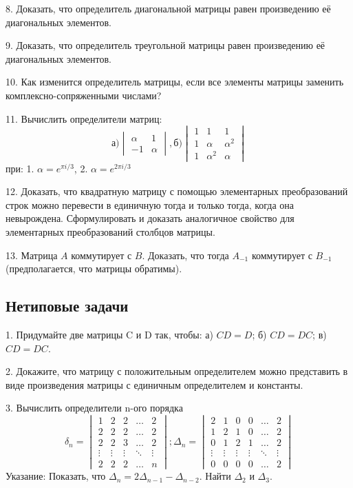 \documentclass[12pt]{article}
\begin{document}
8. Доказать, что определитель диагональной матрицы равен произведению её диагональных элементов.

9. Доказать, что определитель треугольной матрицы равен произведению её диагональных элементов.

10. Как изменится определитель матрицы, если все элементы матрицы заменить комплексно-сопряженными числами?

11. Вычислить определители матриц:
\[
\text{а)}\begin{vmatrix}
\alpha & 1\\
-1 & \alpha
\end{vmatrix},
\text{б)}\begin{vmatrix}
1 & 1 & 1\\
1 & \alpha & \alpha^2\\
1 & \alpha^2 & \alpha
\end{vmatrix}
\] при: 1. $\alpha = e^{\pi i/3}$, 2. $\alpha = e^{2\pi i/3}$


12. Доказать, что квадратную матрицу с помощью элементарных преобразований строк можно перевести в единичную тогда и только тогда, когда она невырождена. Сформулировать и доказать аналогичное свойство для элементарных преобразований столбцов матрицы.

13. Матрица $A$ коммутирует с $B$. Доказать, что тогда $A_{-1}$ коммутирует с $B_{-1}$ (предполагается, что матрицы обратимы).


\subsection*{Нетиповые задачи}	

1. Придумайте две матрицы C и D так, чтобы: а) $CD = D$; б) $CD = DC$; в) $CD = DC$.

2. Докажите, что матрицу с положительным определителем можно представить в виде произведения матрицы с единичным определителем и константы.

3. Вычислить определители n-ого порядка
\[
\delta_{n} = \begin{vmatrix}
1 & 2 & 2 & \dots & 2\\
2 & 2 & 2 & \dots & 2\\
2 & 2 & 3 & \dots & 2\\
\vdots & \vdots & \vdots & \ddots & \vdots\\ 
2 & 2 & 2 & \dots & n
\end{vmatrix}; 
\Delta_{n} = 
\begin{vmatrix}
2 & 1 & 0 & 0 & \dots & 2\\
1 & 2 & 1 & 0 & \dots & 2\\
0 & 1 & 2 & 1 & \dots & 2\\
\vdots & \vdots & \vdots & \vdots & \ddots & \vdots\\
0 & 0 & 0 & 0 & \dots & 2
\end{vmatrix}
\]
{\small Указание: Показать, что $\Delta_{n} = 2\Delta_{n-1} - \Delta_{n-2}$. Найти $\Delta_{2}$ и $\Delta_{3}$.}
\end{document}
